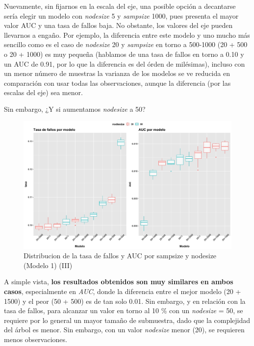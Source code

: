 \documentclass[
]{article}
\begin{document}
Nuevamente, sin fijarnos en la escala del eje, una posible opción a
decantarse sería elegir un modelo con \emph{nodesize} 5 y
\emph{sampsize} 1000, pues presenta el mayor valor AUC y una tasa de
fallos baja. No obstante, los valores del eje pueden llevarnos a engaño.
Por ejemplo, la diferencia entre este modelo y uno mucho más sencillo
como es el caso de \emph{nodesize} 20 y \emph{sampsize} en torno a
500-1000 (20 + 500 o 20 + 1000) es muy pequeña (hablamos de una tasa de
fallos en torno a 0.10 y un AUC de 0.91, por lo que la diferencia es del
órden de milésimas), incluso con un menor número de muestras la varianza
de los modelos se ve reducida en comparación con usar todas las
observaciones, aunque la diferencia (por las escalas del eje) sea menor.

Sin embargo, ¿Y si aumentamos \emph{nodesize} a 50?

\begin{figure}[h!]

{\centering \includegraphics[width=0.99\linewidth,height=0.99\textheight,]{./charts/03_distribucion_auc_tasa_fallos_modelo1_comp_50rep} 

}

\caption{Distribucion de la tasa de fallos y AUC por sampsize y nodesize (Modelo 1) (III)}\label{fig:unnamed-chunk-72}
\end{figure}

A simple vista, \textbf{los resultados obtenidos son muy similares en
ambos casos}, especialmente en \emph{AUC}, donde la diferencia entre el
mejor modelo (20 + 1500) y el peor (50 + 500) es de tan solo 0.01. Sin
embargo, y en relación con la tasa de fallos, para alcanzar un valor en
torno al 10 \% con un \emph{nodesize} = 50, se requiere por lo general
un mayor tamaño de submuestra, dado que la complejidad del árbol es
menor. Sin embargo, con un valor \emph{nodesize} menor (20), se
requieren menos observaciones.
\end{document}
